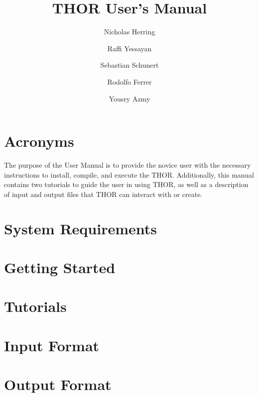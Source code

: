 \documentclass[twoside]{report}
\title{THOR User's Manual}
\author[1]{Nicholas Herring}
\author[2]{Raffi Yessayan}
\author[3]{Sebastian Schunert}
\author[4]{Rodolfo Ferrer}
\author[1]{Yousry Azmy}
\affil[1]{North Carolina State University}
\affil[2]{Los Alamos National Laboratory}
\affil[3]{Idaho National Laboratory}
\affil[4]{Studsvik Scandpower}
\begin{document}



%

\chapter*{Acronyms}


\tableofcontents


\clearpage
{}
\pagestyle{fancy}

The purpose of the User Manual is to provide the novice user with the necessary instructions to install, compile, and execute the \ac{THOR}.
Additionally, this manual contains two tutorials to guide the user in using THOR, as well as a description of input and output files that \ac{THOR} can interact with or create.

\chapter{System Requirements}



\chapter{Getting Started}



\chapter{Tutorials}\label{ch:tutorials}



\chapter{Input Format}



\chapter{Output Format}







\end{document}
